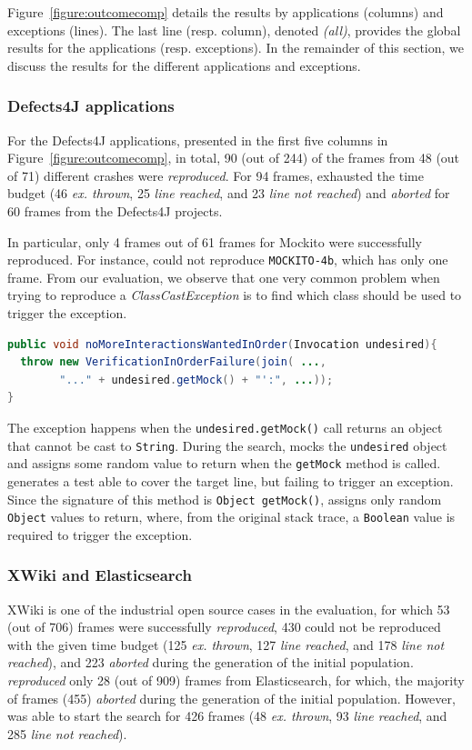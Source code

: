 Figure~\ref{figure:outcomecomp} details the results by applications (columns) and exceptions (lines). The last line (resp. column), denoted \textit{(all)}, provides the global results for the applications (resp. exceptions). In the remainder of this section, we discuss the results for the different applications and exceptions. 

\subsubsection{Defects4J applications}

For the Defects4J applications, presented in the first five columns in Figure~\ref{figure:outcomecomp}, in total, 90 (out of 244) of the frames from 48 (out of 71) different crashes were \emph{reproduced}. 
For 94 frames, \evocrash exhausted the time budget (46 \emph{ex. thrown}, 25 \emph{line reached}, and 23 \emph{line not reached}) and \emph{aborted} for 60 frames from the Defects4J projects. 

In particular, only 4 frames out of 61 frames for Mockito were successfully reproduced.
For instance, \evocrash could not reproduce \texttt{MOCKITO-4b}, which has only one frame.
From our evaluation, we observe that one very common problem when trying to reproduce a \textit{ClassCastException} is to find which class should be used to trigger the exception.
%
\begin{lstlisting}[language=Java]
public void noMoreInteractionsWantedInOrder(Invocation undesired){
  throw new VerificationInOrderFailure(join( ...,
		"..." + undesired.getMock() + "':", ...));
}
\end{lstlisting}
%
The exception happens when the \texttt{undesired.getMock()} call returns an object that cannot be cast to \texttt{String}.
During the search, \evocrash mocks the \texttt{undesired} object and assigns some random value to return when the \texttt{getMock} method is called. 
\evocrash generates a test able to cover the target line, but failing to trigger an exception. 
Since the signature of this method is \texttt{Object getMock()}, \evocrash assigns only random \texttt{Object} values to return, where, from the original stack trace, a \texttt{Boolean} value is required to trigger the exception.

\subsubsection{XWiki and Elasticsearch}

XWiki is one of the industrial open source cases in the evaluation, for which 53 (out of 706) frames were successfully \emph{reproduced}, 430 could not be reproduced with the given time budget (125 \emph{ex. thrown}, 127 \emph{line reached}, and 178 \emph{line not reached}), and 223  \emph{aborted} during the generation of the initial population.
%
\evocrash \emph{reproduced} only 28 (out of 909) frames from Elasticsearch, for which, the majority of frames (455) \emph{aborted}  during the generation of the initial population. However, \evocrash was able to start the search for 426 frames (48 \emph{ex. thrown}, 93 \emph{line reached}, and 285 \emph{line not reached}).


